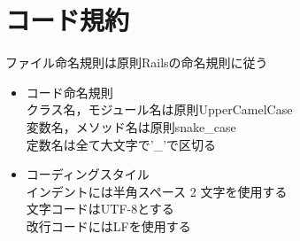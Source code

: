 \section{コード規約}
ファイル命名規則は原則Railsの命名規則に従う
\begin{itemize}
\item コード命名規則\\
クラス名，モジュール名は原則UpperCamelCase\\
変数名，メソッド名は原則snake\_case\\
定数名は全て大文字で'\_'で区切る\\
\item コーディングスタイル \\
インデントには半角スペース 2 文字を使用する \\
文字コードはUTF-8とする \\
改行コードにはLFを使用する \\
\end{itemize}
